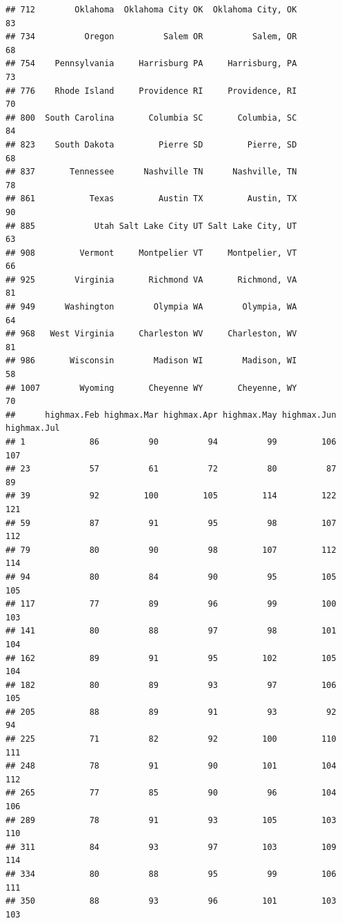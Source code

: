 \documentclass[
]{article}
\begin{document}
\begin{verbatim}
## 712        Oklahoma  Oklahoma City OK  Oklahoma City, OK          83
## 734          Oregon          Salem OR          Salem, OR          68
## 754    Pennsylvania     Harrisburg PA     Harrisburg, PA          73
## 776    Rhode Island     Providence RI     Providence, RI          70
## 800  South Carolina       Columbia SC       Columbia, SC          84
## 823    South Dakota         Pierre SD         Pierre, SD          68
## 837       Tennessee      Nashville TN      Nashville, TN          78
## 861           Texas         Austin TX         Austin, TX          90
## 885            Utah Salt Lake City UT Salt Lake City, UT          63
## 908         Vermont     Montpelier VT     Montpelier, VT          66
## 925        Virginia       Richmond VA       Richmond, VA          81
## 949      Washington        Olympia WA        Olympia, WA          64
## 968   West Virginia     Charleston WV     Charleston, WV          81
## 986       Wisconsin        Madison WI        Madison, WI          58
## 1007        Wyoming       Cheyenne WY       Cheyenne, WY          70
##      highmax.Feb highmax.Mar highmax.Apr highmax.May highmax.Jun highmax.Jul
## 1             86          90          94          99         106         107
## 23            57          61          72          80          87          89
## 39            92         100         105         114         122         121
## 59            87          91          95          98         107         112
## 79            80          90          98         107         112         114
## 94            80          84          90          95         105         105
## 117           77          89          96          99         100         103
## 141           80          88          97          98         101         104
## 162           89          91          95         102         105         104
## 182           80          89          93          97         106         105
## 205           88          89          91          93          92          94
## 225           71          82          92         100         110         111
## 248           78          91          90         101         104         112
## 265           77          85          90          96         104         106
## 289           78          91          93         105         103         110
## 311           84          93          97         103         109         114
## 334           80          88          95          99         106         111
## 350           88          93          96         101         103         103

\end{verbatim}
\end{document}

